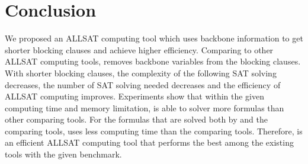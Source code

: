 \section{Conclusion} \label{sec:conc}
We proposed an ALLSAT computing tool \tool which uses backbone information to get shorter blocking clauses and achieve higher efficiency.
Comparing to other ALLSAT computing tools, \tool removes backbone variables from the blocking clauses. With shorter blocking clauses, the complexity of the following SAT solving decreases, the number of SAT solving needed decreases and the efficiency of ALLSAT computing improves. 
Experiments show that within the given computing time and memory limitation, \tool is able to solver more formulas than other comparing tools.
For the formulas that are solved both by \tool and the comparing tools, \tool uses less computing time than the comparing tools.
Therefore, \tool is an efficient ALLSAT computing tool that performs the best among the existing tools with the given benchmark.